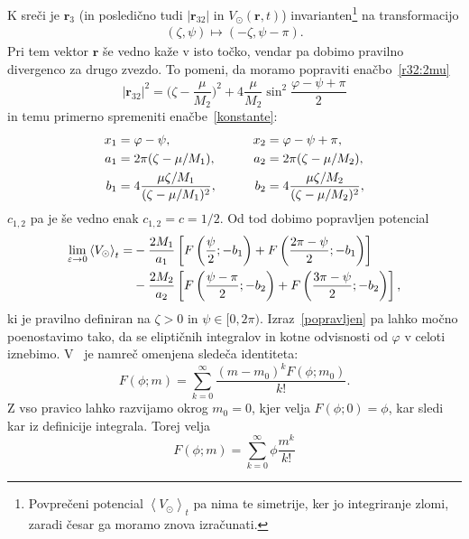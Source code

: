 \documentclass[12pt, a4paper]{article}
\renewcommand{\r}{
    \ensuremath{\mathbf{r}}
}
\newcommand{\avgt}[1]{
	\ensuremath{\left\langle #1 \right\rangle_t}
}
\begin{document}
K sre\v ci je $\r_3$ (in posledi\v cno tudi $|\r_{32}|$ in $V_\odot(\r,t)$) invarianten\footnote{Povpre\v ceni
potencial $\avgt{V_\odot}$ pa nima te simetrije, ker jo integriranje zlomi, zaradi \v cesar ga moramo znova
izra\v cunati.} na transformacijo
\begin{align*}
	(\zeta, \psi) \mapsto (-\zeta, \psi - \pi).
\end{align*}
Pri tem vektor $\r$ \v se vedno ka\v ze v isto to\v cko, vendar pa dobimo pravilno divergenco za drugo zvezdo.
To pomeni, da moramo popraviti ena\v cbo~\eqref{r32:2mu}
\begin{equation}
	|\r_{32}|^2 = \Big(\zeta - \frac{\mu}{M_2}\Big)^2 + 4\frac{\mu}{M_2}\sin^2\frac{\varphi - \psi + \pi}{2}
\end{equation}
in temu primerno spremeniti ena\v cbe~\eqref{konstante}:
\begin{alignat}{3}
	x_1 &= \varphi - \psi, \qquad& x_2 &= \varphi - \psi + \pi, \notag \\
	a_1 &= 2\pi(\zeta - \mu/M_1), \qquad& a_2 &= 2\pi(\zeta - \mu/M_2), \notag \\
	b_1 &= 4\frac{\mu\zeta/M_1}{(\zeta - \mu/M_1)^2}, \qquad& b_2 &= 4\frac{\mu\zeta/M_2}{(\zeta - \mu/M_2)^2},
\end{alignat}
$c_{1,2}$ pa je \v se vedno enak $c_{1,2} = c = 1/2$. Od tod dobimo popravljen potencial
\begin{align}
	\lim_{\varepsilon \to 0} \avgt{V_\odot} = &- \frac{2M_1}{a_1}\left[F\left(\frac{\psi}{2}; -b_1\right)
		+ F\left(\frac{2\pi - \psi}{2}; -b_1\right)\right] \notag \\
	&- \frac{2 M_2}{a_2}\left[F\left(\frac{\psi - \pi}{2}; -b_2\right)
		+ F\left(\frac{3\pi - \psi}{2}; -b_2\right)\right],
	\label{popravljen}
\end{align}
ki je pravilno definiran na $\zeta > 0$ in $\psi \in [0, 2\pi)$. Izraz~\eqref{popravljen} pa lahko mo\v cno poenostavimo
tako, da se elipti\v cnih integralov in kotne odvisnosti od $\varphi$ v celoti iznebimo. V~\cite{wolfram} je namre\v c
omenjena slede\v ca identiteta:
\begin{equation}
	F(\phi;m) = \sum_{k = 0}^\infty \frac{(m - m_0)^k F(\phi;m_0)}{k!}.
\end{equation}
Z vso pravico lahko razvijamo okrog $m_0 = 0$, kjer velja $F(\phi;0) = \phi$, kar sledi kar iz definicije integrala.
Torej velja
\begin{equation}
	F(\phi;m) = \sum_{k = 0}^\infty \phi \frac{m^k}{k!}
	\label{razvoj}
\end{equation}
\end{document}
